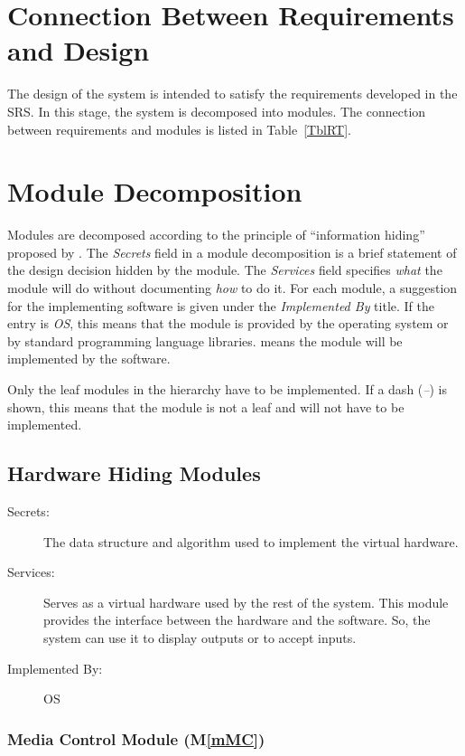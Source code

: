 \documentclass[12pt, titlepage]{article}
\newcommand{\mref}[1]{M\ref{#1}}
\begin{document}
\section{Connection Between Requirements and Design} \label{SecConnection}

The design of the system is intended to satisfy the requirements developed in
the SRS. In this stage, the system is decomposed into modules. The connection
between requirements and modules is listed in Table~\ref{TblRT}.

\section{Module Decomposition} \label{SecMD}

Modules are decomposed according to the principle of ``information hiding''
proposed by \citet{ParnasEtAl1984}. The \emph{Secrets} field in a module
decomposition is a brief statement of the design decision hidden by the
module. The \emph{Services} field specifies \emph{what} the module will do
without documenting \emph{how} to do it. For each module, a suggestion for the
implementing software is given under the \emph{Implemented By} title. If the
entry is \emph{OS}, this means that the module is provided by the operating
system or by standard programming language libraries.  \emph{\progname{}} means the
module will be implemented by the \progname{} software.

Only the leaf modules in the hierarchy have to be implemented. If a dash
(\emph{--}) is shown, this means that the module is not a leaf and will not have
to be implemented.

\subsection{Hardware Hiding Modules}

\begin{description}
\item[Secrets:]The data structure and algorithm used to implement the virtual
  hardware.
\item[Services:]Serves as a virtual hardware used by the rest of the
  system. This module provides the interface between the hardware and the
  software. So, the system can use it to display outputs or to accept inputs.
\item[Implemented By:] OS
\end{description}

\subsubsection{Media Control Module (\mref{mMC})}
\end{document}

